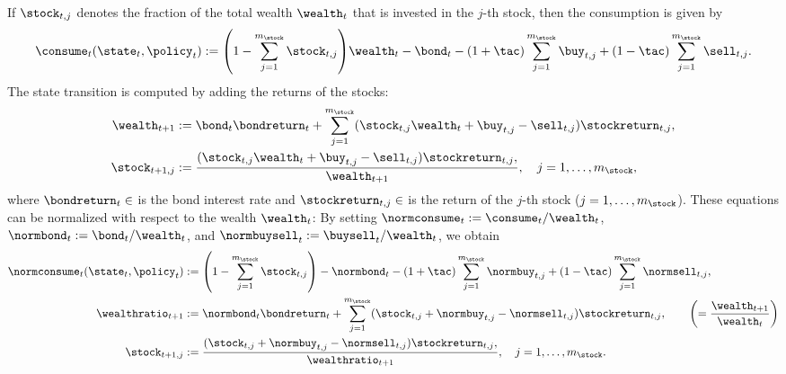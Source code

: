 If $\stock_{t,j}$ denotes the fraction of the total wealth $\wealth_t$
that is invested in the $j$-th stock,
then the consumption is given by
\begin{equation}
  \consume_t(\state_t, \policy_t)
  := \paren*{1 - \sum_{j=1}^{m_\stock} \stock_{t,j}} \wealth_t - \bond_t -
  (1 + \tac) \sum_{j=1}^{m_\stock} \buy_{t,j} +
  (1 - \tac) \sum_{j=1}^{m_\stock} \sell_{t,j}.
\end{equation}
The state transition is computed by adding the returns of the stocks:
\begin{subequations}
  \begin{align}
    \wealth_{t+1}
    &:= \bond_t \bondreturn_t + \sum_{j=1}^{m_\stock}
    (\stock_{t,j} \wealth_t + \buy_{t,j} - \sell_{t,j}) \stockreturn_{t,j},\\
    \stock_{t+1,j}
    &:= \frac{
      (\stock_{t,j} \wealth_t + \buy_{t,j} - \sell_{t,j}) \stockreturn_{t,j},
    }{\wealth_{t+1}},\quad
    j = 1, \dotsc, m_\stock,
  \end{align}
\end{subequations}
where $\bondreturn_t \in \real$ is the bond interest rate and
$\stockreturn_{t,j} \in \real$ is the return of the $j$-th stock
($j = 1, \dotsc, m_\stock$).
These equations can be normalized with respect to the wealth $\wealth_t$:
By setting
$\normconsume_t := \consume_t/\wealth_t$,
$\normbond_t    := \bond_t   /\wealth_t$, and
$\normbuysell_t := \buysell_t/\wealth_t$, we obtain
\begin{subequations}
  \begin{align}
    \normconsume_t(\state_t, \policy_t)
    &:= \paren*{1 - \sum_{j=1}^{m_\stock} \stock_{t,j}} - \normbond_t -
    (1 + \tac) \sum_{j=1}^{m_\stock} \normbuy_{t,j} +
    (1 - \tac) \sum_{j=1}^{m_\stock} \normsell_{t,j},\\
    \wealthratio_{t+1}
    &:= \normbond_t \bondreturn_t + \sum_{j=1}^{m_\stock}
    (\stock_{t,j} + \normbuy_{t,j} - \normsell_{t,j}) \stockreturn_{t,j},
    \qquad\left(= \frac{\wealth_{t+1}}{\wealth_t}\right)\\
    \stock_{t+1,j}
    &:= \frac{
      (\stock_{t,j} + \normbuy_{t,j} - \normsell_{t,j}) \stockreturn_{t,j},
    }{\wealthratio_{t+1}},\quad
    j = 1, \dotsc, m_\stock.
  \end{align}
\end{subequations}
